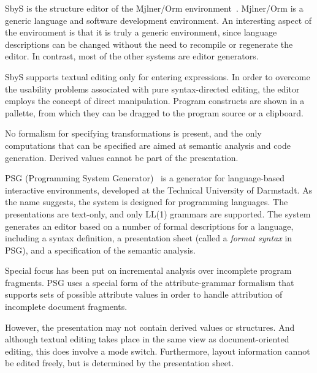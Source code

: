 
SbyS is the structure editor of the Mj\slasho lner/Orm environment~\cite{magnusson90orm}. Mj\slasho lner/Orm is a generic language and software development environment. An interesting aspect of the environment is that it is truly a generic environment, since language descriptions can be changed without the need to recompile or regenerate the editor. In contrast, most of the other systems are editor generators.

SbyS supports textual editing only for entering expressions. In order to overcome the usability problems associated with pure syntax-directed editing, the editor employs the concept of direct manipulation. Program constructs are shown in a pallette, from which they can be dragged to the program source or a clipboard.

No formalism for specifying transformations is present, and the only computations that can be specified are aimed at semantic analysis and code generation. Derived values cannot be part of the presentation.



PSG (Programming System Generator)~\cite{Bahlke86PSG} is a generator for language-based interactive environments, developed at the Technical University of Darmstadt. As the name suggests, the system is designed for programming languages. The presentations are text-only, and only LL(1) grammars are supported. The system generates an editor based on a number of formal descriptions for a language, including a syntax definition, a presentation sheet (called a {\em format syntax} in PSG), and a specification of the semantic analysis.

Special focus has been put on incremental analysis over incomplete program fragments. PSG uses a special form of the attribute-grammar formalism that supports sets of possible attribute values in order to handle attribution of incomplete document fragments.

However, the presentation may not contain derived values or structures. And although textual editing takes place in the same view as document-oriented editing, this does involve a mode switch. Furthermore, layout information cannot be edited freely, but is determined by the presentation sheet.


